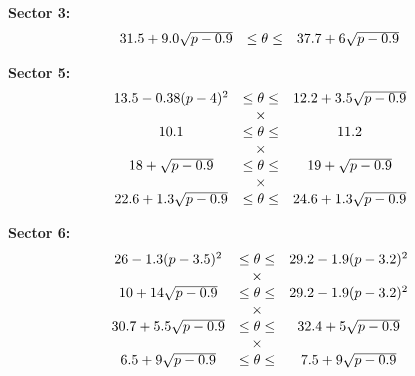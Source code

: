 {\bf Sector 3:}
$$
\begin{array}{c c c}
31.5 +9.0\sqrt{p-0.9} & \le \theta \le  & 37.7+6\sqrt{p-0.9} \\
\end{array}
$$


{\bf Sector 5:}
$$
\begin{array}{c c c}
13.5 -0.38(p-4)^2 & \le \theta \le  & 12.2+3.5\sqrt{p-0.9} \\
& \times & \\
10.1 & \le \theta \le & 11.2 \\
& \times & \\
18 +\sqrt{p-0.9} & \le \theta \le  & 19+\sqrt{p-0.9} \\
& \times & \\
22.6 +1.3\sqrt{p-0.9} & \le \theta \le  & 24.6+1.3\sqrt{p-0.9} \\
\end{array}
$$


{\bf Sector 6:}
$$
\begin{array}{c c c}
26 -1.3(p-3.5)^2 & \le \theta \le  & 29.2 -1.9(p-3.2)^2 \\
& \times & \\
10 +14\sqrt{p-0.9} & \le \theta \le  & 29.2 -1.9(p-3.2)^2 \\
& \times & \\
30.7 +5.5\sqrt{p-0.9} & \le \theta \le  & 32.4+5\sqrt{p-0.9} \\
& \times & \\
6.5 +9\sqrt{p-0.9} & \le \theta \le  & 7.5+9\sqrt{p-0.9} \\
\end{array}
$$











